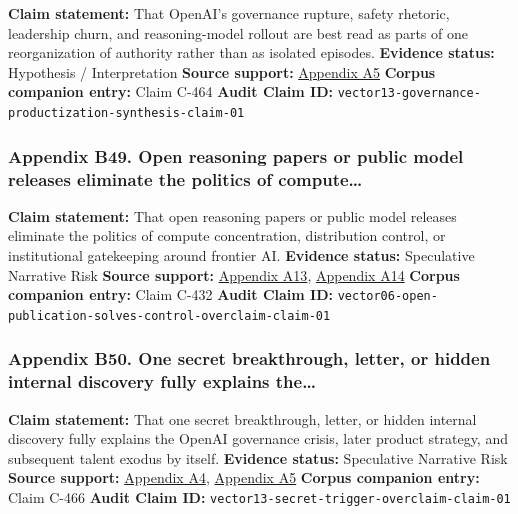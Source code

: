 \documentclass[
  american,
  11pt,
  letterpaper,
]{article}
\begin{document}
\textbf{Claim statement:} That OpenAI's governance rupture, safety
rhetoric, leadership churn, and reasoning-model rollout are best read as
parts of one reorganization of authority rather than as isolated
episodes. \textbf{Evidence status:} Hypothesis / Interpretation
\textbf{Source support:}
\hyperref[ch-06-appendix-a5-exclusive-openai-working-on-new-reasoning-technology-under-code-name-strawberry]{Appendix
A5} \textbf{Corpus companion entry:} Claim C-464 \textbf{Audit Claim
ID:} \texttt{vector13-governance-productization-synthesis-claim-01}

\subsubsection{Appendix B49. Open reasoning papers or public model
releases eliminate the politics of
compute\ldots{}}\label{ch-06-appendix-b49-open-reasoning-papers-or-public-model-releases-eliminate-the-politics-of-compute}

\textbf{Claim statement:} That open reasoning papers or public model
releases eliminate the politics of compute concentration, distribution
control, or institutional gatekeeping around frontier AI.
\textbf{Evidence status:} Speculative Narrative Risk \textbf{Source
support:}
\hyperref[ch-06-appendix-a13-deepseek-v3-technical-report]{Appendix
A13},
\hyperref[ch-06-appendix-a14-deepseek-r1-incentivizing-reasoning-capability-in-llms-via-reinforcement-learning]{Appendix
A14} \textbf{Corpus companion entry:} Claim C-432 \textbf{Audit Claim
ID:}
\texttt{vector06-open-publication-solves-control-overclaim-claim-01}

\subsubsection{Appendix B50. One secret breakthrough, letter, or hidden
internal discovery fully explains
the\ldots{}}\label{ch-06-appendix-b50-one-secret-breakthrough-letter-or-hidden-internal-discovery-fully-explains-the}

\textbf{Claim statement:} That one secret breakthrough, letter, or
hidden internal discovery fully explains the OpenAI governance crisis,
later product strategy, and subsequent talent exodus by itself.
\textbf{Evidence status:} Speculative Narrative Risk \textbf{Source
support:}
\hyperref[ch-06-appendix-a4-openai-researchers-warned-board-of-ai-breakthrough-ahead-of-ceo-ouster-sources-say]{Appendix
A4},
\hyperref[ch-06-appendix-a5-exclusive-openai-working-on-new-reasoning-technology-under-code-name-strawberry]{Appendix
A5} \textbf{Corpus companion entry:} Claim C-466 \textbf{Audit Claim
ID:} \texttt{vector13-secret-trigger-overclaim-claim-01}
\end{document}

